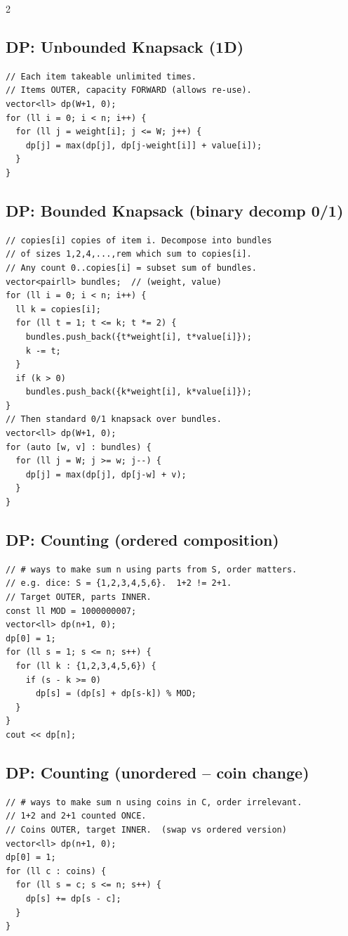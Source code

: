 \documentclass[10pt,letterpaper]{extarticle}
\newenvironment{block}[1]
  {\subsection*{#1}\nopagebreak}
  {\par\addvspace{2pt}}
\begin{document}
\begin{multicols*}{2}
\begin{block}{DP: Unbounded Knapsack (1D)}
\begin{lstlisting}
// Each item takeable unlimited times.
// Items OUTER, capacity FORWARD (allows re-use).
vector<ll> dp(W+1, 0);
for (ll i = 0; i < n; i++) {
  for (ll j = weight[i]; j <= W; j++) {
    dp[j] = max(dp[j], dp[j-weight[i]] + value[i]);
  }
}
\end{lstlisting}
\end{block}

\begin{block}{DP: Bounded Knapsack (binary decomp \textrightarrow{} 0/1)}
\begin{lstlisting}
// copies[i] copies of item i. Decompose into bundles
// of sizes 1,2,4,...,rem which sum to copies[i].
// Any count 0..copies[i] = subset sum of bundles.
vector<pairll> bundles;  // (weight, value)
for (ll i = 0; i < n; i++) {
  ll k = copies[i];
  for (ll t = 1; t <= k; t *= 2) {
    bundles.push_back({t*weight[i], t*value[i]});
    k -= t;
  }
  if (k > 0)
    bundles.push_back({k*weight[i], k*value[i]});
}
// Then standard 0/1 knapsack over bundles.
vector<ll> dp(W+1, 0);
for (auto [w, v] : bundles) {
  for (ll j = W; j >= w; j--) {
    dp[j] = max(dp[j], dp[j-w] + v);
  }
}
\end{lstlisting}
\end{block}

\begin{block}{DP: Counting (ordered composition)}
\begin{lstlisting}
// # ways to make sum n using parts from S, order matters.
// e.g. dice: S = {1,2,3,4,5,6}.  1+2 != 2+1.
// Target OUTER, parts INNER.
const ll MOD = 1000000007;
vector<ll> dp(n+1, 0);
dp[0] = 1;
for (ll s = 1; s <= n; s++) {
  for (ll k : {1,2,3,4,5,6}) {
    if (s - k >= 0)
      dp[s] = (dp[s] + dp[s-k]) % MOD;
  }
}
cout << dp[n];
\end{lstlisting}
\end{block}

\begin{block}{DP: Counting (unordered -- coin change)}
\begin{lstlisting}
// # ways to make sum n using coins in C, order irrelevant.
// 1+2 and 2+1 counted ONCE.
// Coins OUTER, target INNER.  (swap vs ordered version)
vector<ll> dp(n+1, 0);
dp[0] = 1;
for (ll c : coins) {
  for (ll s = c; s <= n; s++) {
    dp[s] += dp[s - c];
  }
}
\end{lstlisting}
\end{block}


\end{multicols*}
\end{document}
